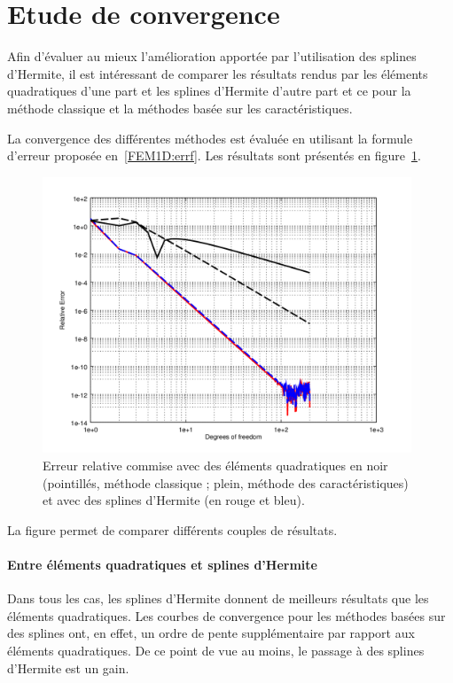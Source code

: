 \section{Etude de convergence}

Afin d'évaluer au mieux l'amélioration apportée par l'utilisation des splines d'Hermite, il est intéressant de comparer
les résultats rendus par les éléments quadratiques d'une part et les splines d'Hermite d'autre part et ce pour la
méthode classique et la méthodes basée sur les caractéristiques.

La convergence des différentes méthodes est évaluée en utilisant la formule d'erreur proposée en~\eqref{FEM1D:errf}.
Les résultats sont présentés en figure~\ref{fig:comp_quad_herm}.

\begin{figure}[!ht]
	\centering
	\includegraphics[width=11cm]{part4/figs/herm_comp.png}
	\caption{\label{fig:comp_quad_herm}Erreur relative commise avec des éléments quadratiques en noir (pointillés,
	méthode classique ; plein, méthode des caractéristiques) et avec des splines d'Hermite (en rouge et bleu).}
\end{figure}

La figure permet de comparer différents couples de résultats.

\paragraph{Entre éléments quadratiques et splines d'Hermite}
Dans tous les cas, les splines d'Hermite donnent de meilleurs résultats que les éléments quadratiques. Les courbes de
convergence pour les méthodes basées sur des splines ont, en effet, un ordre de pente supplémentaire par rapport aux
éléments quadratiques. De ce point de vue au moins, le passage à des splines d'Hermite est un gain.

